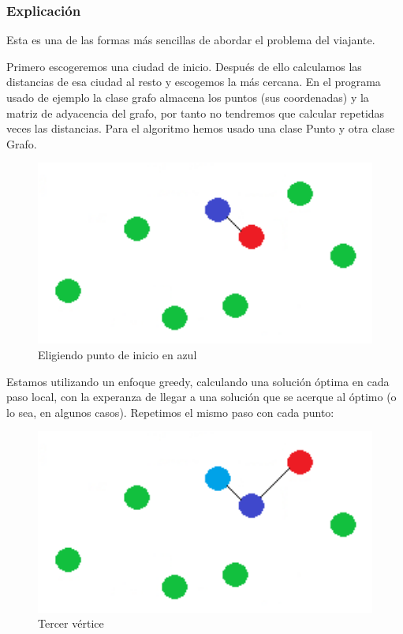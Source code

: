 \subsubsection{Explicación}
Esta es una de las formas más sencillas de abordar el problema del viajante.

Primero escogeremos una ciudad de inicio. Después de ello calculamos las distancias de esa ciudad al resto y escogemos la más cercana.
En el programa usado de ejemplo la clase grafo almacena los puntos (sus coordenadas) y la matriz de adyacencia del grafo, por tanto no 
tendremos que calcular repetidas veces las distancias. 
Para el algoritmo hemos usado una clase Punto y otra clase Grafo.

\begin{figure}[htb] 
	\centering
	\includegraphics[width=1\textwidth]{./Imagenes/vecino1.png}
	\caption{Eligiendo punto de inicio en azul} 
\end{figure}

Estamos utilizando un enfoque greedy, calculando una solución óptima en cada paso local, con la experanza de llegar a una solución que se
acerque al óptimo (o lo sea, en algunos casos). Repetimos el mismo paso con cada punto:

\begin{figure}[htb] 
	\centering
	\includegraphics[width=1.75\textwidth]{./Imagenes/vecino2.png}
	\caption{Tercer vértice} 
\end{figure}


